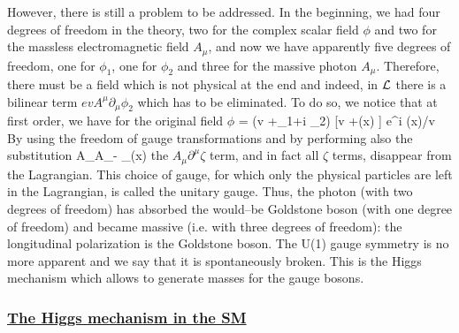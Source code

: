 However, there is still a problem to be addressed. In the beginning, we had
four degrees of freedom in the theory, two for the complex scalar field $\phi$
and two for the massless electromagnetic field $A_\mu$, and now we have
apparently five degrees of freedom, one for $\phi_1$, one for $\phi_2$ and
three for the massive photon $A_\mu$. Therefore, there must be a field which
is not physical at the end and indeed, in ${\cal L}$ there is a bilinear term
$evA^\mu \partial_\mu \phi_2$ which has to be eliminated. To do so, we notice
that at first order, we have for the original field $\phi$
\beq
\phi=  (v +\phi_1+i \phi_2)  \equiv {} 
[v +\eta (x) ] e^{i \zeta(x)/v} 
\eeq
By using the freedom of gauge transformations and by performing also the 
substitution 
\beq
A_\mu \to A_\mu -  \partial_\mu \zeta(x)
\eeq
the $A_\mu \partial^\mu \zeta$ term, and in fact all $\zeta$ terms, disappear
from the Lagrangian. This choice of gauge, for which only the physical
particles are left in the Lagrangian, is called the unitary gauge.  Thus,   the
photon (with two degrees of freedom) has absorbed the would--be Goldstone boson
(with one degree of freedom) and became massive (i.e. with three degrees of
freedom): the longitudinal polarization is the Goldstone boson. The U(1) gauge
symmetry is no more apparent and we say that it is spontaneously broken.  This
is the Higgs mechanism \cite{Higgs} which allows to generate masses for
the gauge bosons.

\subsubsection*{\underline{The Higgs mechanism in the SM}}

